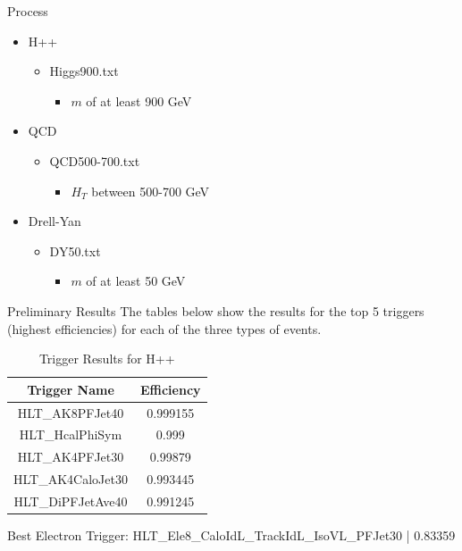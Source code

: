 \documentclass{beamer}
\newlength{\colwidth}
\begin{document}
\begin{frame}[t]
\begin{columns}[t]
\begin{column}{\colwidth}
\begin{block}{Process}
    \begin{itemize}
        \item H++
        \begin{itemize}
            \item Higgs900.txt
            \begin{itemize}
                \item $m$ of at least 900 GeV
            \end{itemize}
        \end{itemize}
        \item QCD
        \begin{itemize}
            \item QCD500-700.txt
            \begin{itemize}
                \item $H_T$ between 500-700 GeV
            \end{itemize}
        \end{itemize}
        \item Drell-Yan
        \begin{itemize}
            \item DY50.txt
            \begin{itemize}
                \item $m$ of at least 50 GeV
            \end{itemize}
        \end{itemize}
    \end{itemize}
  \end{block}

  \begin{block}{Preliminary Results}
    The tables below show the results for the top 5 triggers (highest efficiencies) for each of the three types of events.

    \begin{table}[]
      \begin{center}
           \caption{\label{table:1}Trigger Results for H++}
     \begin{tabular}[t]{c|c}
          \hline
          \textbf{Trigger Name} & \textbf{Efficiency}\\
          \hline
          HLT\_AK8PFJet40 & 0.999155\\
          HLT\_HcalPhiSym & 0.999 \\
          HLT\_AK4PFJet30 & 0.99879 \\
          HLT\_AK4CaloJet30 & 0.993445 \\
          HLT\_DiPFJetAve40  & 0.991245
      \end{tabular}
    \end{center}
    \end{table}
    Best Electron Trigger: HLT\_Ele8\_CaloIdL\_TrackIdL\_IsoVL\_PFJet30 | 0.83359


\end{block}
\end{column}
\end{columns}
\end{frame}
\end{document}
